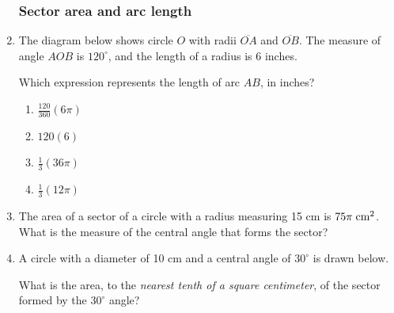 \documentclass[12pt, oneside]{article}
\begin{document}
\begin{enumerate}[itemsep=0cm]
\subsubsection*{Sector area and arc length}
\item The diagram below shows circle $O$ with radii $\overline{OA}$ and $\overline{OB}$. The measure of angle $AOB$ is $120^\circ$, and the length of a radius is 6 inches.
\begin{center}
  \end{center}
  Which expression represents the length of arc $AB$, in inches?
  \begin{multicols}{2}
    \begin{enumerate}
      \item $\displaystyle \frac{120}{360}(6\pi)$
      \item $\displaystyle 120(6)$
      \item $\displaystyle \frac{1}{3}(36\pi)$
      \item $\displaystyle \frac{1}{3}(12\pi)$
    \end{enumerate}
  \end{multicols}

\item The area of a sector of a circle with a radius measuring 15 cm is $75\pi \; \rm{cm}^2$. What is the measure of the central angle that forms the sector?

\item A circle with a diameter of 10 cm and a central angle of $30^\circ$ is drawn below.
\begin{center}
  \end{center}
  What is the area, to the \emph{nearest tenth of a square centimeter}, of the sector formed by the $30^\circ$ angle?


\end{enumerate}
\end{document}
